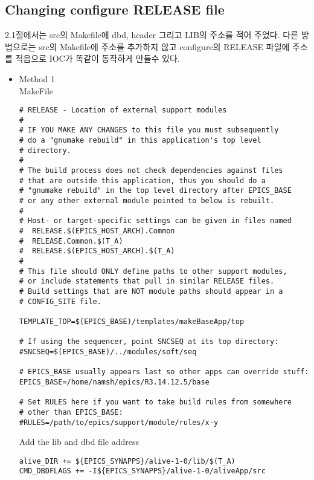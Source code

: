 \documentclass[11pt
  , a4paper
  , article
  , oneside
]{memoir}
\begin{document}
\subsection{Changing configure RELEASE file}
2.1절에서는 src의 Makefile에 dbd, header 그리고 LIB의 주소를 적어 주었다. 다른 방법으로는
src의 Makefile에 주소를 추가하지 않고 configure의 RELEASE 파일에 주소를 적음으로 IOC가 똑같이
동작하게 만들수 있다.
\begin{itemize}
\item Method 1\\
MakeFile

\begin{lstlisting}[style=termstyle]
# RELEASE - Location of external support modules
#
# IF YOU MAKE ANY CHANGES to this file you must subsequently
# do a "gnumake rebuild" in this application's top level
# directory.
#
# The build process does not check dependencies against files
# that are outside this application, thus you should do a
# "gnumake rebuild" in the top level directory after EPICS_BASE
# or any other external module pointed to below is rebuilt.
#
# Host- or target-specific settings can be given in files named
#  RELEASE.$(EPICS_HOST_ARCH).Common
#  RELEASE.Common.$(T_A)
#  RELEASE.$(EPICS_HOST_ARCH).$(T_A)
#
# This file should ONLY define paths to other support modules,
# or include statements that pull in similar RELEASE files.
# Build settings that are NOT module paths should appear in a
# CONFIG_SITE file.

TEMPLATE_TOP=$(EPICS_BASE)/templates/makeBaseApp/top

# If using the sequencer, point SNCSEQ at its top directory:
#SNCSEQ=$(EPICS_BASE)/../modules/soft/seq

# EPICS_BASE usually appears last so other apps can override stuff:
EPICS_BASE=/home/namsh/epics/R3.14.12.5/base

# Set RULES here if you want to take build rules from somewhere
# other than EPICS_BASE:
#RULES=/path/to/epics/support/module/rules/x-y
\end{lstlisting}
Add the lib and dbd file address
	\begin{lstlisting}[style=termstyle]
alive_DIR += ${EPICS_SYNAPPS}/alive-1-0/lib/$(T_A)
CMD_DBDFLAGS += -I${EPICS_SYNAPPS}/alive-1-0/aliveApp/src


\end{lstlisting}
\end{itemize}
\end{document}
